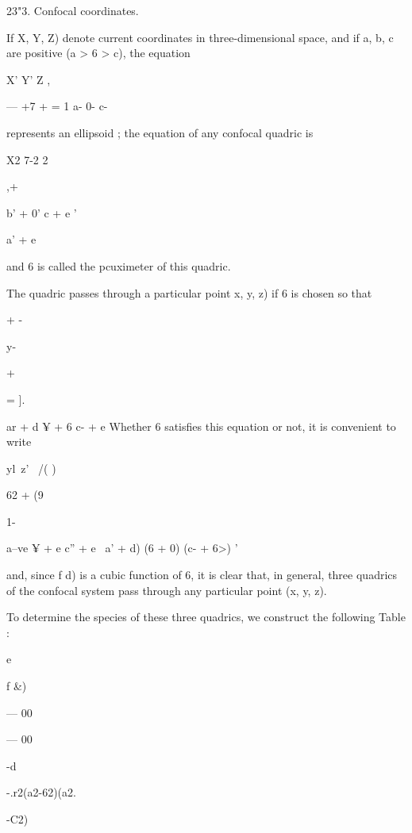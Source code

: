 {{23"3. Confocal coordinates. 

If  X, Y, Z) denote current coordinates in three-dimensional space, and if 
a, b, c are positive (a > 6 > c), the equation 

X' Y' Z  , 

— +7 +  = 1 
a- 0- c- 

represents an ellipsoid ; the equation of any confocal quadric is 

X2 7-2  2 



,+ 



b' + 0' c  + e  ' 



a' + e 

and 6 is called the pcuximeter of this quadric. 

The quadric passes through a particular point  x, y, z) if 6 is chosen 
so that 



+ - 



y- 



+ 



= ]. 



ar + d ¥ + 6 c- + e 
Whether 6 satisfies this equation or not, it is convenient to write 

  yl\  z' \  /( ) 

62 + (9 



1- 



a--ve ¥ + e c'' + e~  a' + d) (6  + 0) (c- + 6>) ' 

and, since f d) is a cubic function of 6, it is clear that, in general, three 
quadrics of the confocal system pass through any particular point (x, y, z). 

To determine the species of these three quadrics, we construct the following 
Table : 



e 


f \&) 


— 00 


— 00 




-d  


-.r2(a2-62)(a2. 


-C2) 


}}
